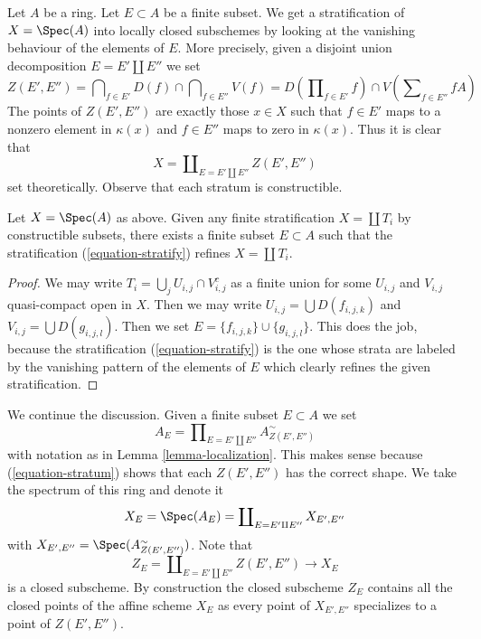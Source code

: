 \noindent
Let $A$ be a ring. Let $E \subset A$ be a finite subset. We get a
stratification of $X = \Spec(A)$ into locally closed subschemes by
looking at the vanishing behaviour of the elements of $E$. More precisely,
given a disjoint union decomposition $E = E' \amalg E''$ we set
\begin{equation}
\label{equation-stratum}
Z(E', E'') =
\bigcap\nolimits_{f \in E'} D(f) \cap \bigcap\nolimits_{f \in E''} V(f) =
D(\prod\nolimits_{f \in E'} f) \cap V( \sum\nolimits_{f \in E''} fA)
\end{equation}
The points of $Z(E', E'')$ are exactly those $x \in X$ such that
$f \in E'$ maps to a nonzero element in $\kappa(x)$ and $f \in E''$
maps to zero in $\kappa(x)$. Thus it is clear that
\begin{equation}
\label{equation-stratify}
X = \coprod\nolimits_{E = E' \amalg E''} Z(E', E'')
\end{equation}
set theoretically. Observe that each stratum is constructible.

\begin{lemma}
\label{lemma-refine}
Let $X = \Spec(A)$ as above. Given any finite stratification
$X = \coprod T_i$ by constructible subsets, there exists a finite
subset $E \subset A$ such that the stratification (\ref{equation-stratify})
refines $X = \coprod T_i$.
\end{lemma}

\begin{proof}
We may write $T_i = \bigcup_j U_{i, j} \cap V_{i, j}^c$ as a finite union
for some $U_{i, j}$ and $V_{i, j}$ quasi-compact open in $X$.
Then we may write $U_{i, j} = \bigcup D(f_{i, j, k})$ and
$V_{i, j} = \bigcup D(g_{i, j, l})$. Then we set
$E = \{f_{i, j, k}\} \cup \{g_{i, j, l}\}$. This does the job, because
the stratification (\ref{equation-stratify}) is the one whose strata are
labeled by the vanishing pattern of the elements of $E$ which
clearly refines the given stratification.
\end{proof}

\noindent
We continue the discussion.
Given a finite subset $E \subset A$ we set
\begin{equation}
\label{equation-ring}
A_E = \prod\nolimits_{E = E' \amalg E''} A_{Z(E', E'')}^\sim
\end{equation}
with notation as in Lemma \ref{lemma-localization}. This makes sense because
(\ref{equation-stratum}) shows that each $Z(E', E'')$ has the correct shape.
We take the spectrum of this ring and denote it
\begin{equation}
\label{equation-spectrum}
X_E = \Spec(A_E) = \coprod\nolimits_{E = E' \amalg E''} X_{E', E''}
\end{equation}
with $X_{E', E''} = \Spec(A_{Z(E', E'')}^\sim)$. Note that
\begin{equation}
\label{equation-closed}
Z_E = \coprod\nolimits_{E = E' \amalg E''} Z(E', E'')
\longrightarrow
X_E
\end{equation}
is a closed subscheme. By construction the closed subscheme $Z_E$
contains all the closed points of the affine scheme $X_E$ as every point
of $X_{E', E''}$ specializes to a point of $Z(E', E'')$.

